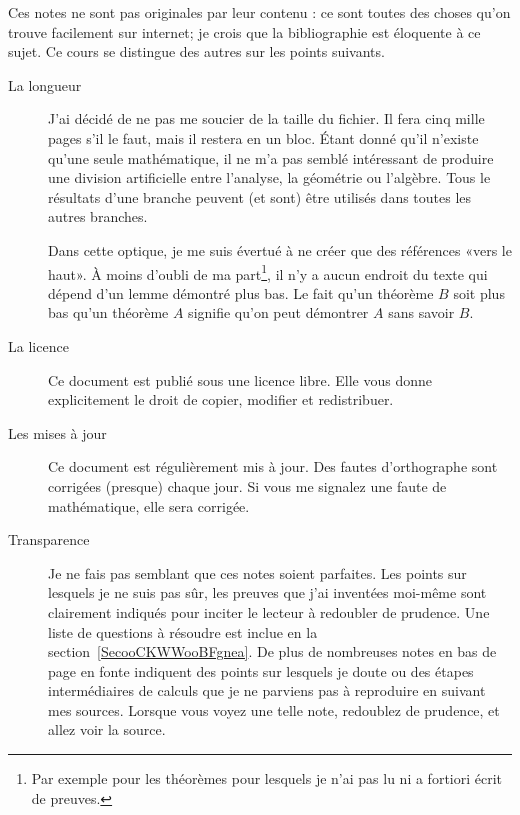 Ces notes ne sont pas originales par leur contenu : ce sont toutes des choses qu'on trouve facilement sur internet; je crois que la bibliographie est éloquente à ce sujet. Ce cours se distingue des autres sur les points suivants.
\begin{description}
    \item[La longueur] J'ai décidé de ne pas me soucier de la taille du fichier. Il fera cinq mille pages s'il le faut, mais il restera en un bloc. Étant donné qu'il n'existe qu'une seule mathématique, il ne m'a pas semblé intéressant de produire une division artificielle entre l'analyse, la géométrie ou l'algèbre. Tous le résultats d'une branche peuvent (et sont) être utilisés dans toutes les autres branches.

        Dans cette optique, je me suis évertué à ne créer que des références «vers le haut». À moins d'oubli de ma part\footnote{Par exemple pour les théorèmes pour lesquels je n'ai pas lu ni a fortiori écrit de preuves.}, il n'y a aucun endroit du texte qui dépend d'un lemme démontré plus bas. Le fait qu'un théorème \( B\) soit plus bas qu'un théorème \( A\) signifie qu'on peut démontrer \( A\) sans savoir \( B\).

    \item[La licence] Ce document est publié sous une licence libre. Elle vous donne explicitement le droit de copier, modifier et redistribuer.

    \item[Les mises à jour] Ce document est régulièrement mis à jour. Des fautes d'orthographe sont corrigées (presque) chaque jour. Si vous me signalez une faute de mathématique, elle sera corrigée.
    \item[Transparence] Je ne fais pas semblant que ces notes soient parfaites. Les points sur lesquels je ne suis pas sûr, les preuves que j'ai inventées moi-même sont clairement indiqués pour inciter le lecteur à redoubler de prudence. Une liste de questions à résoudre est inclue en la section~\ref{SecooCKWWooBFgnea}. De plus de nombreuses notes en bas de page en fonte  indiquent des points sur lesquels je doute ou des étapes intermédiaires de calculs que je ne parviens pas à reproduire en suivant mes sources. Lorsque vous voyez une telle note, redoublez de prudence, et allez voir la source.
        
\end{description}

